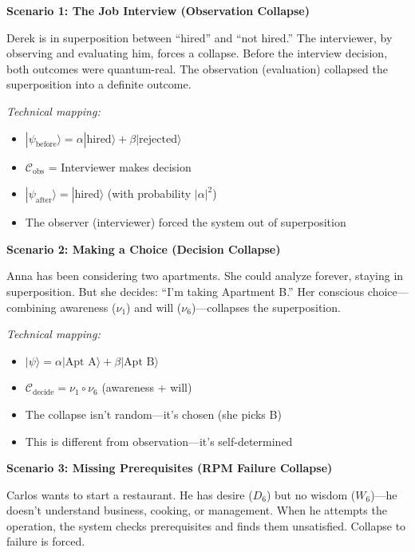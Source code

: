 \documentclass[11pt,twoside]{book}
\newcommand{\noe}[1]{\nu_{#1}}
\newcommand{\Collapse}{\mathcal{C}}
\begin{document}
\begin{tcolorbox}[colback=yellow!5!white,colframe=yellow!65!black,title=\textbf{Real-Life Scenarios: Collapse Conditions},breakable]

\textbf{Scenario 1: The Job Interview (Observation Collapse)}

Derek is in superposition between ``hired'' and ``not hired.'' The interviewer, by observing and evaluating him, forces a collapse. Before the interview decision, both outcomes were quantum-real. The observation (evaluation) collapsed the superposition into a definite outcome.

\textit{Technical mapping:}
\begin{itemize}
    \item $|\psi_{\mathrm{before}}\rangle = \alpha|\text{hired}\rangle + \beta|\text{rejected}\rangle$
    \item $\Collapse_{\mathrm{obs}}$ = Interviewer makes decision
    \item $|\psi_{\mathrm{after}}\rangle = |\text{hired}\rangle$ (with probability $|\alpha|^2$)
    \item The observer (interviewer) forced the system out of superposition
\end{itemize}

\textbf{Scenario 2: Making a Choice (Decision Collapse)}

Anna has been considering two apartments. She could analyze forever, staying in superposition. But she decides: ``I'm taking Apartment B.'' Her conscious choice---combining awareness ($\noe{1}$) and will ($\noe{6}$)---collapses the superposition.

\textit{Technical mapping:}
\begin{itemize}
    \item $|\psi\rangle = \alpha|\text{Apt A}\rangle + \beta|\text{Apt B}\rangle$
    \item $\Collapse_{\mathrm{decide}} = \noe{1} \circ \noe{6}$ (awareness + will)
    \item The collapse isn't random---it's chosen (she picks B)
    \item This is different from observation---it's self-determined
\end{itemize}

\textbf{Scenario 3: Missing Prerequisites (RPM Failure Collapse)}

Carlos wants to start a restaurant. He has desire ($D_6$) but no wisdom ($W_6$)---he doesn't understand business, cooking, or management. When he attempts the operation, the system checks prerequisites and finds them unsatisfied. Collapse to failure is forced.


\end{tcolorbox}
\end{document}
